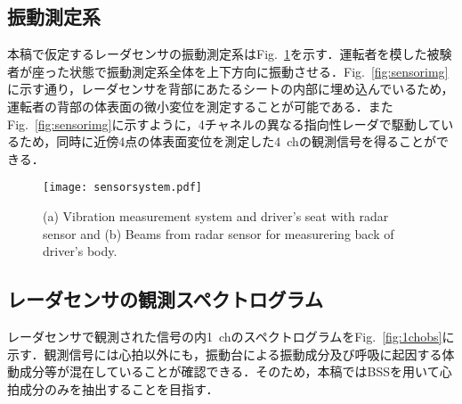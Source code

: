 \documentclass[a4j]{jsarticle}
\begin{document}
\subsection{振動測定系}

本稿で仮定するレーダセンサの振動測定系はFig.~\ref{fig:sensorstructure}を示す．運転者を模した被験者が座った状態で振動測定系全体を上下方向に振動させる．Fig.~\ref{fig:sensorimg}に示す通り，レーダセンサを背部にあたるシートの内部に埋め込んでいるため，運転者の背部の体表面の微小変位を測定することが可能である．またFig.~\ref{fig:sensorimg}に示すように，4チャネルの異なる指向性レーダで駆動しているため，同時に近傍4点の体表面変位を測定した4~chの観測信号を得ることができる．
\begin{figure}[tb]
  \centering
  \vspace{0pt} %
  \texttt{[image: sensorsystem.pdf]}
  \vspace{0pt} %
  \caption{(a) Vibration measurement system and driver's seat with radar sensor and (b) Beams from radar sensor for measurering back of driver's body.}
  \vspace{0pt} %
  \label{fig:sensorstructure}
\end{figure}


\subsection{レーダセンサの観測スペクトログラム}

レーダセンサで観測された信号の内1~chのスペクトログラムをFig.~\ref{fig:1chobs}に示す．観測信号には心拍以外にも，振動台による振動成分及び呼吸に起因する体動成分等が混在していることが確認できる．そのため，本稿ではBSSを用いて心拍成分のみを抽出することを目指す．
\end{document}

